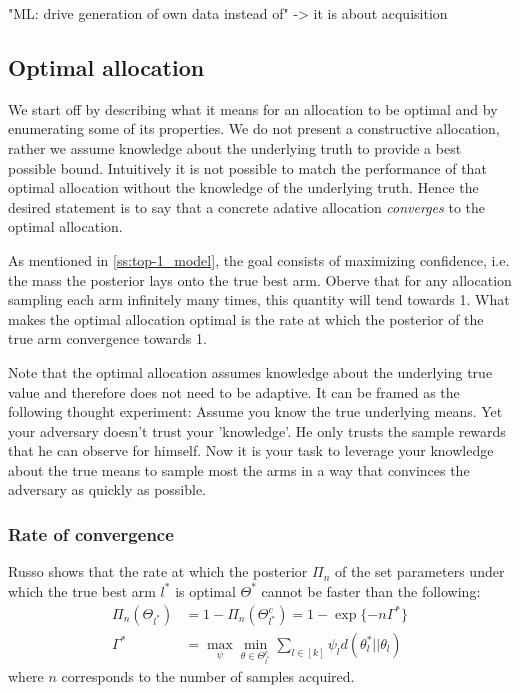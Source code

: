 "ML: drive generation of own data instead of" -> it is about acquisition

\subsection{Optimal allocation}\label{subsection:optimal_allocation}


We start off by describing what it means for an allocation to be optimal and by enumerating some of its properties. We do not present a constructive allocation, rather we assume knowledge about the underlying truth to provide a best possible bound. Intuitively it is not possible to match the performance of that optimal allocation without the knowledge of the underlying truth. Hence the desired statement is to say that a concrete adative allocation \emph{converges} to the optimal allocation.

As mentioned in \ref{ss:top-1_model}, the goal consists of maximizing confidence, i.e. the mass the posterior lays onto the true best arm. Oberve that for any allocation sampling each arm infinitely many times, this quantity will tend towards 1. What makes the optimal allocation optimal is the rate at which the posterior of the true arm convergence towards 1.

Note that the optimal allocation assumes knowledge about the underlying true value and therefore does not need to be adaptive. It can be framed as the following thought experiment: Assume you know the true underlying means. Yet your adversary doesn't trust your 'knowledge'. He only trusts the sample rewards that he can observe for himself. Now it is your task to leverage your knowledge about the true means to sample most the arms in a way that convinces the adversary as quickly as possible.

\subsubsection{Rate of convergence}
Russo \cite{DBLP:journals/corr/Russo16} shows that the rate at which the posterior $\Pi_n$ of the set parameters under which the true best arm $l^*$ is optimal $\Theta^*$ cannot be faster than the following:
\begin{align}
  \Pi_n(\Theta_{l^*}) &= 1 - \Pi_n(\Theta^c_{l^*}) = 1 - \exp\{-n\Gamma^*\} \\
  \Gamma^* &= \max_{\psi} \min_{\theta \in \Theta^c_{l^*}} \sum_{l \in [k]} \psi_l d(\theta_l^* || \theta_l)
\end{align}
where $n$ corresponds to the number of samples acquired.

